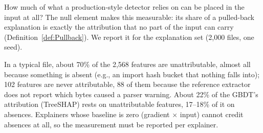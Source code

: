 \label{sec:XML:AppLocalizability}

How much of what a production-style detector relies on can be placed in the input at all? The null element makes this measurable: its share of a pulled-back explanation is exactly the attribution that no part of the input can carry (Definition~\ref{def:Pullback}). We report it for the explanation set (2{,}000 files, one seed).

In a typical file, about 70\% of the 2{,}568 features are unattributable, almost all because something is absent (e.g., an import hash bucket that nothing falls into); 102 features are never attributable, 88 of them because the reference extractor does not report which bytes caused a parser warning. About 22\% of the GBDT's attribution (TreeSHAP) rests on unattributable features, 17--18\% of it on absences. Explainers whose baseline is zero (gradient $\times$ input) cannot credit absences at all, so the measurement must be reported per explainer.
